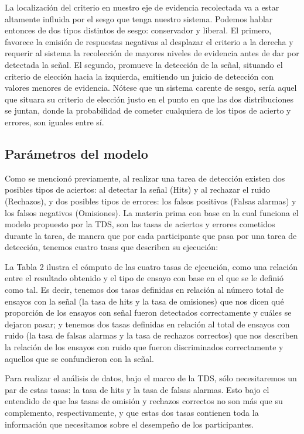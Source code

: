 La localización del criterio en nuestro eje de evidencia recolectada va a estar altamente influida por el sesgo que tenga nuestro sistema. Podemos hablar entonces de dos tipos distintos de sesgo: conservador y liberal. El primero, favorece la emisión de respuestas negativas al desplazar el criterio a la derecha y requerir al sistema la recolección de mayores niveles de evidencia antes de dar por detectada la señal. El segundo, promueve la detección de la señal, situando el criterio de elección hacia la izquierda, emitiendo un juicio de detección con valores menores de evidencia. Nótese que un sistema carente de sesgo, sería aquel que situara su criterio de elección justo en el punto en que las dos distribuciones se juntan, donde la probabilidad de cometer cualquiera de los tipos de acierto y errores, son iguales entre sí.\\


\subsection{Parámetros del modelo}

Como se mencionó previamente, al realizar una tarea de detección existen dos posibles tipos de aciertos: al detectar la señal (Hits) y al rechazar el ruido (Rechazos), y dos posibles tipos de errores: los falsos positivos (Falsas alarmas) y los falsos negativos (Omisiones). La materia prima con base en la cual funciona el modelo propuesto por la TDS, son las tasas de aciertos y errores cometidos durante la tarea, de manera que por cada participante que pasa por una tarea de detección, tenemos cuatro tasas que describen su ejecución:

La Tabla 2 ilustra el cómputo de las cuatro tasas de ejecución, como una relación entre el resultado obtenido y el tipo de ensayo con base en el que se le definió como tal. Es decir, tenemos dos tasas definidas en relación al número total de ensayos con la señal (la tasa de hits y la tasa de omisiones) que nos dicen qué proporción de los ensayos con señal fueron detectados correctamente y cuáles se dejaron pasar; y tenemos dos tasas definidas en relación al total de ensayos con ruido (la tasa de falsas alarmas y la tasa de rechazos correctos) que nos describen la relación de los ensayos con ruido que fueron discriminados correctamente y aquellos que se confundieron con la señal.

Para realizar el análisis de datos, bajo el marco de la TDS, sólo necesitaremos un par de estas tasas: la tasa de hits y la tasa de falsas alarmas. Esto bajo el entendido de que las tasas de omisión y rechazos correctos no son más que su complemento, respectivamente, y que estas dos tasas contienen toda la información que necesitamos sobre el desempeño de los participantes.

